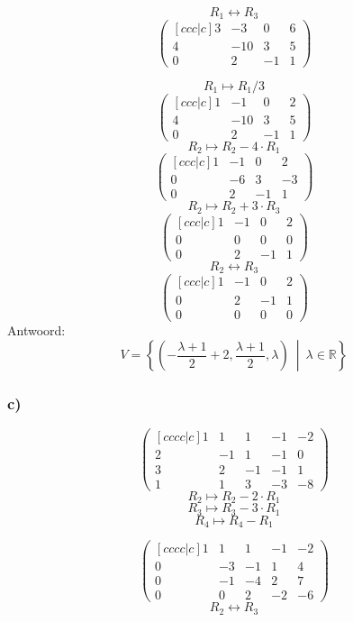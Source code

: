 \documentclass[lineaire_algebra_oplossingen.tex]{subfiles}
\begin{document}
\[ R_1 \leftrightarrow R_3\]
\[
\begin{pmatrix}[ccc|c]
3 & -3 & 0 & 6\\
4 & -10 & 3 & 5\\
0 & 2 & -1 & 1
\end{pmatrix}
\]

\[ R_1 \longmapsto R_1 / 3\]
\[
\begin{pmatrix}[ccc|c]
1 & -1 & 0 & 2\\
4 & -10 & 3 & 5\\
0 & 2 & -1 & 1
\end{pmatrix}
\]
\[ R_2 \longmapsto R_2 - 4\cdot R_1\]
\[
\begin{pmatrix}[ccc|c]
1 & -1 & 0 & 2\\
0 & -6 & 3 & -3\\
0 & 2 & -1 & 1
\end{pmatrix}
\]
\[ R_2 \longmapsto R_2 + 3\cdot R_3\]
\[
\begin{pmatrix}[ccc|c]
1 & -1 & 0 & 2\\
0 & 0 & 0 & 0\\
0 & 2 & -1 & 1
\end{pmatrix}
\]
\[ R_2 \leftrightarrow R_3\]
\[
\begin{pmatrix}[ccc|c]
1 & -1 & 0 & 2\\
0 & 2 & -1 & 1\\
0 & 0 & 0 & 0
\end{pmatrix}
\]
Antwoord:
\[
V = \left\{\left( -\frac{\lambda+1}{2} + 2,\frac{\lambda+1}{2},\lambda \right)\ \middle|\ \lambda \in \mathbb{R} \right\}
\]

\subsubsection*{c)}
\[
\begin{pmatrix}[cccc|c]
1 & 1 & 1 &-1&-2\\
2 & -1 & 1 & -1 & 0\\
3 & 2 & -1 & -1 & 1\\
1 & 1 & 3 & -3 & -8
\end{pmatrix}
\]
\[ R_2 \longmapsto R_2 - 2\cdot R_1\]
\[ R_3 \longmapsto R_3 - 3\cdot R_1\]
\[ R_4 \longmapsto R_4 - R_1\]

\[
\begin{pmatrix}[cccc|c]
1 & 1 & 1 & -1 & -2\\
0 & -3 & -1 & 1 & 4\\
0 & -1 & -4 & 2 & 7\\
0 & 0 & 2 & -2 & -6
\end{pmatrix}
\]
\[ R_2 \leftrightarrow R_3\]
\end{document}
